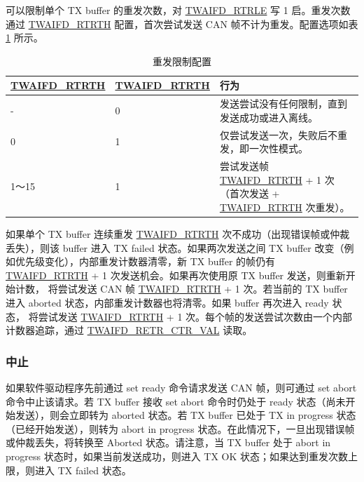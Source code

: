 \documentclass[main\_\_CN.tex]{subfiles}
\begin{document}
\modulename{} 可以限制单个 TX buffer 的重发次数，对 \hyperref[fielddesc:TWAIFDRTRLE]{TWAIFD\_RTRLE} 写 1 启。重发次数通过 \hyperref[fielddesc:TWAIFDRTRTH]{TWAIFD\_RTRTH} 配置，首次尝试发送 CAN 帧不计为重发。配置选项如表 \ref{tab:twai-retrans-counter-config} 所示。

\begin{table}[H]
    \centering
    \caption{重发限制配置}
    \label{tab:twai-retrans-counter-config}
    \begin{tabular}{ |l|l|m{9.2cm}| }
    \hline
    \rowcolor{lightgray}
    \textbf{\hyperref[fielddesc:TWAIFDRTRTH]{TWAIFD\_RTRTH}} & \textbf{\hyperref[fielddesc:TWAIFDRTRTH]{TWAIFD\_RTRTH}} & \textbf{行为}\\\hline
    - & 0 & 发送尝试没有任何限制，直到发送成功或进入离线。\\\hline
    0 & 1 & 仅尝试发送一次，失败后不重发，即一次性模式。\\\hline
    1～15 & 1 & 尝试发送帧 \hyperref[fielddesc:TWAIFDRTRTH]{TWAIFD\_RTRTH} + 1 次（首次发送 + \hyperref[fielddesc:TWAIFDRTRTH]{TWAIFD\_RTRTH} 次重发）。\\\hline
    \end{tabular}
\end{table}

如果单个 TX buffer 连续重发 \hyperref[fielddesc:TWAIFDRTRTH]{TWAIFD\_RTRTH} 次不成功（出现错误帧或仲裁丢失），则该 buffer 进入 TX failed 状态。如果两次发送之间 TX buffer 改变（例如优先级变化），内部重发计数器清零，新 TX buffer 的帧仍有 \hyperref[fielddesc:TWAIFDRTRTH]{TWAIFD\_RTRTH} + 1 次发送机会。如果再次使用原 TX buffer 发送，则重新开始计数，\modulename{} 将尝试发送 CAN 帧 \hyperref[fielddesc:TWAIFDRTRTH]{TWAIFD\_RTRTH} + 1 次。若当前的 TX buffer 进入 aborted 状态，内部重发计数器也将清零。如果 buffer 再次进入 ready 状态，\modulename{} 将尝试发送 \hyperref[fielddesc:TWAIFDRTRTH]{TWAIFD\_RTRTH} + 1 次。每个帧的发送尝试次数由一个内部计数器追踪，通过 \hyperref[fielddesc:TWAIFDRETRCTRVAL]{TWAIFD\_RETR\_CTR\_VAL} 读取。


\subsubsection{中止}

如果软件驱动程序先前通过 set ready 命令请求发送 CAN 帧，则可通过 set abort 命令中止该请求。若 TX buffer 接收 set abort 命令时仍处于 ready 状态（尚未开始发送），则会立即转为 aborted 状态。若 TX buffer 已处于 TX in progress 状态（已经开始发送），则转为 abort in progress 状态。在此情况下，一旦出现错误帧或仲裁丢失，将转换至 Aborted 状态。请注意，当 TX buffer 处于 abort in progress 状态时，如果当前发送成功，则进入 TX OK 状态；如果达到重发次数上限，则进入 TX failed 状态。
\end{document}
